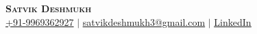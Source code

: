 \documentclass[../../resume]{subfiles}
\begin{document}
\begin{center}
    \textbf{\Huge \scshape Satvik Deshmukh} \\ \vspace{1pt}
    \href{tel:9969362927}{+91-9969362927} $|$ 
    \href{mailto:satvikdeshmukh3@gmail.com}{\underline{satvikdeshmukh3@gmail.com}} $|$ 
    \href{https://www.linkedin.com/in/satvik-deshmukh3/}{\underline{LinkedIn}}
\end{center}
\end{document}
